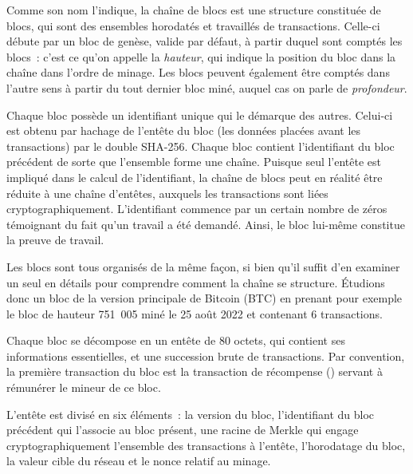 Comme son nom l'indique, la chaîne de blocs est une structure constituée de blocs, qui sont des ensembles horodatés et travaillés de transactions. Celle-ci débute par un bloc de genèse, valide par défaut, à partir duquel sont comptés les blocs~: c'est ce qu'on appelle la \emph{hauteur}, qui indique la position du bloc dans la chaîne dans l'ordre de minage. Les blocs peuvent également être comptés dans l'autre sens à partir du tout dernier bloc miné, auquel cas on parle de \emph{profondeur}.

Chaque bloc possède un identifiant unique qui le démarque des autres. Celui-ci est obtenu par hachage de l'entête du bloc (les données placées avant les transactions) par le double SHA-256. Chaque bloc contient l'identifiant du bloc précédent de sorte que l'ensemble forme une chaîne. Puisque seul l'entête est impliqué dans le calcul de l'identifiant, la chaîne de blocs peut en réalité être réduite à une chaîne d'entêtes, auxquels les transactions sont liées cryptographiquement. L'identifiant commence par un certain nombre de zéros témoignant du fait qu'un travail a été demandé. Ainsi, le bloc lui-même constitue la preuve de travail. %

Les blocs sont tous organisés de la même façon, si bien qu'il suffit d'en examiner un seul en détails pour comprendre comment la chaîne se structure. Étudions donc un bloc de la version principale de Bitcoin (BTC) en prenant pour exemple le bloc de hauteur 751~005 miné le 25 août 2022 et contenant 6 transactions.




Chaque bloc se décompose en un entête de 80 octets, qui contient ses informations essentielles, et une succession brute de transactions. Par convention, la première transaction du bloc est la transaction de récompense () servant à rémunérer le mineur de ce bloc.

L'entête est divisé en six éléments~: la version du bloc, l'identifiant du bloc précédent qui l'associe au bloc présent, une racine de Merkle qui engage cryptographiquement l'ensemble des transactions à l'entête, l'horodatage du bloc, la valeur cible du réseau et le nonce relatif au minage.


